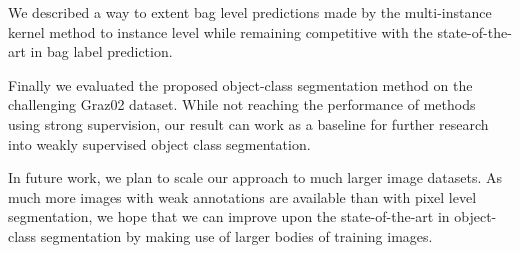We described a way to extent bag level predictions made by the multi-instance
kernel method to instance level while remaining competitive with the state-of-the-art
in bag label prediction.

Finally we evaluated the proposed object-class segmentation method on the challenging
Graz02 dataset. While not reaching the performance of methods using strong supervision,
our result can work as a baseline for further research into weakly supervised object class
segmentation.

In future work, we plan to scale our approach to much larger image datasets. As much
more images with weak annotations are available than with pixel level segmentation,
we hope that we can improve upon the state-of-the-art in object-class segmentation
by making use of larger bodies of training images.
